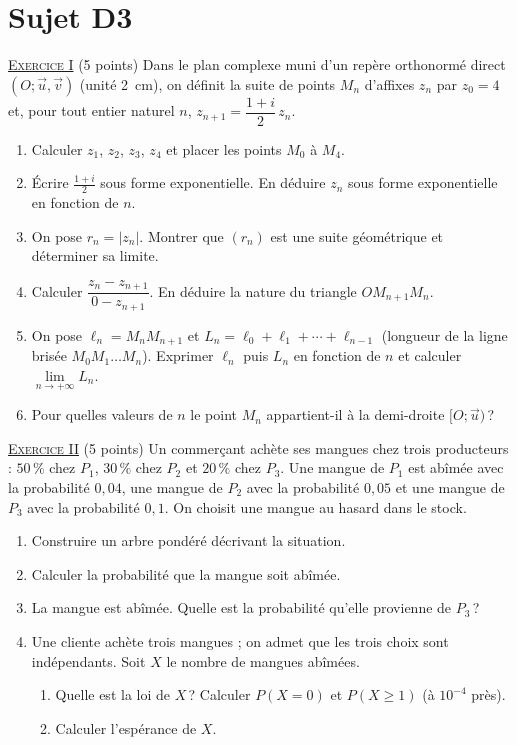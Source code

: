 \newpage
\section{Sujet D3}
\noindent \underline{\textsc{Exercice I}} (5 points) \newline
Dans le plan complexe muni d'un rep\`ere orthonorm\'e direct $(O ; \vec{u}, \vec{v})$ (unit\'e 2~cm), on d\'efinit la suite
de points $M_n$ d'affixes $z_n$ par $z_0 = 4$ et, pour tout entier naturel $n$, $z_{n+1} = \dfrac{1 + i}{2}\, z_n$.
\begin{enumerate}
      \item Calculer $z_1$, $z_2$, $z_3$, $z_4$ et placer les points $M_0$ \`a $M_4$.
      \item \'Ecrire $\frac{1+i}{2}$ sous forme exponentielle. En d\'eduire $z_n$ sous forme exponentielle en fonction de $n$.
      \item On pose $r_n = |z_n|$. Montrer que $(r_n)$ est une suite g\'eom\'etrique et d\'eterminer sa limite.
      \item Calculer $\dfrac{z_n - z_{n+1}}{0 - z_{n+1}}$. En d\'eduire la nature du triangle $O M_{n+1} M_n$.
      \item On pose $\ell_n = M_n M_{n+1}$ et $L_n = \ell_0 + \ell_1 + \cdots + \ell_{n-1}$ (longueur de la ligne bris\'ee $M_0 M_1 \ldots M_n$).
            Exprimer $\ell_n$ puis $L_n$ en fonction de $n$ et calculer $\lim\limits_{n \to +\infty} L_n$.
      \item Pour quelles valeurs de $n$ le point $M_n$ appartient-il \`a la demi-droite $[O ; \vec{u})$\,?
\end{enumerate}

\noindent \underline{\textsc{Exercice II}} (5 points) \newline
Un commer\c{c}ant ach\`ete ses mangues chez trois producteurs : $50\,\%$ chez $P_1$, $30\,\%$ chez $P_2$ et $20\,\%$ chez $P_3$.
Une mangue de $P_1$ est ab\^im\'ee avec la probabilit\'e $0{,}04$, une mangue de $P_2$ avec la probabilit\'e $0{,}05$
et une mangue de $P_3$ avec la probabilit\'e $0{,}1$. On choisit une mangue au hasard dans le stock.
\begin{enumerate}
      \item Construire un arbre pond\'er\'e d\'ecrivant la situation.
      \item Calculer la probabilit\'e que la mangue soit ab\^im\'ee.
      \item La mangue est ab\^im\'ee. Quelle est la probabilit\'e qu'elle provienne de $P_3$\,?
      \item Une cliente ach\`ete trois mangues ; on admet que les trois choix sont ind\'ependants.
            Soit $X$ le nombre de mangues ab\^im\'ees.
            \begin{enumerate}
            \item Quelle est la loi de $X$\,? Calculer $P(X = 0)$ et $P(X \geq 1)$ (\`a $10^{-4}$ pr\`es).
            \item Calculer l'esp\'erance de $X$.
            \end{enumerate}
\end{enumerate}

